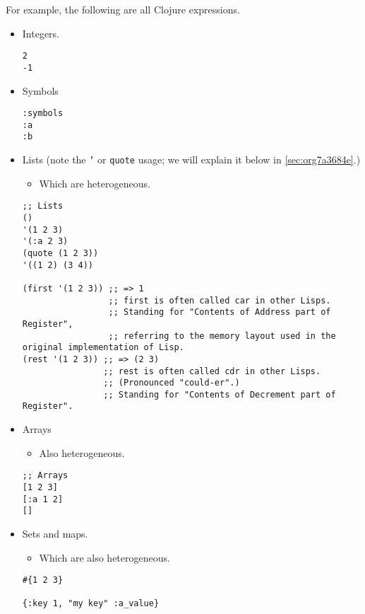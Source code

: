 \documentclass[11pt]{article}
\begin{document}
For example, the following are all Clojure expressions.
\begin{itemize}
\item Integers.
\begin{verbatim}
2
-1
\end{verbatim}
\item Symbols
\begin{verbatim}
:symbols
:a
:b
\end{verbatim}

\item Lists (note the \texttt{'} or \texttt{quote} usage; we will explain it below in \ref{sec:org7a3684e}.)
\begin{itemize}
\item Which are heterogeneous.
\end{itemize}
\begin{verbatim}
;; Lists
()
'(1 2 3)
'(:a 2 3)
(quote (1 2 3))
'((1 2) (3 4))

(first '(1 2 3)) ;; => 1
                 ;; first is often called car in other Lisps.
                 ;; Standing for "Contents of Address part of Register",
                 ;; referring to the memory layout used in the original implementation of Lisp.
(rest '(1 2 3)) ;; => (2 3)
                ;; rest is often called cdr in other Lisps.
                ;; (Pronounced "could-er".)
                ;; Standing for "Contents of Decrement part of Register".
\end{verbatim}

\item Arrays
\begin{itemize}
\item Also heterogeneous.
\end{itemize}
\begin{verbatim}
;; Arrays
[1 2 3]
[:a 1 2]
[]
\end{verbatim}

\item Sets and maps.
\begin{itemize}
\item Which are also heterogeneous.
\end{itemize}
\begin{verbatim}
#{1 2 3}

{:key 1, "my key" :a_value}
\end{verbatim}
\end{itemize}
\end{document}
